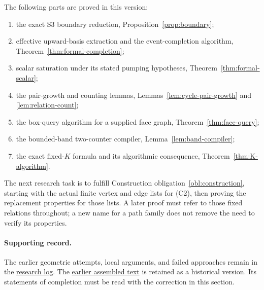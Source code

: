 \documentclass[11pt,a4paper]{article}
\theoremstyle{definition}
\theoremstyle{remark}
\begin{document}
The following parts are proved in this version:
\begin{enumerate}[leftmargin=*]
\item the exact S3 boundary reduction,
      Proposition~\ref{prop:boundary};
\item effective upward-basis extraction and the event-completion
      algorithm, Theorem~\ref{thm:formal-completion};
\item scalar saturation under its stated pumping hypotheses,
      Theorem~\ref{thm:formal-scalar};
\item the pair-growth and counting lemmas,
      Lemmas~\ref{lem:cycle-pair-growth} and
      \ref{lem:relation-count};
\item the box-query algorithm for a supplied face graph,
      Theorem~\ref{thm:face-query};
\item the bounded-band two-counter compiler,
      Lemma~\ref{lem:band-compiler};
\item the exact fixed-\(K\) formula and its algorithmic consequence,
      Theorem~\ref{thm:K-algorithm}.
\end{enumerate}
The next research task is to fulfill
Construction obligation~\ref{obl:construction}, starting with the
actual finite vertex and edge lists for (C2), then proving the
replacement properties for those lists. A later proof must refer to
those fixed relations throughout; a new name for a path family does
not remove the need to verify its properties.

\paragraph{Supporting record.}
The earlier geometric attempts, local arguments, and failed approaches
remain in the
\href{https://chatgpt.com/library?file_id=libfile_f10d80492b688191970c625ab3952096&account_id=personal}{research log}.
The
\href{https://chatgpt.com/library?file_id=libfile_7338a158ba3c8191a7b47b1688ce2dd5&account_id=personal}{earlier assembled text}
is retained as a historical version. Its statements of completion
must be read with the correction in this section.
\end{document}
